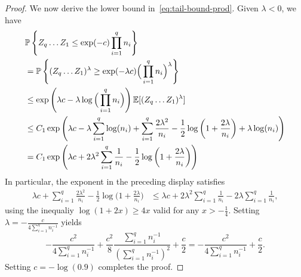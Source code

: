 \begin{proof}
    We now derive the lower bound in~\cref{eq:tail-bound-prod}.
    Given $\lambda < 0$, we have
	\begin{align*}
		 &\mathbb{P}\left\{ {Z_{q} \dots Z_1 \leq \exp(-c) \prod_{i=1}^q n_i} \right\} \\
		 & =\mathbb{P}\left\{ {(Z_{q} \dots Z_1)^{\lambda} \geq \exp(-\lambda c) \Big(\prod_{i=1}^q n_i\Big)^{\lambda}} \right\} \\
		 & \leq
		\exp\left(\lambda c - \lambda \log\Big(\prod_{i=1}^q n_i\Big)\right) \mathbb{E}[(Z_q \dots Z_1)^{\lambda}]
		\\
		 & \leq
		C_1 \exp\left(\lambda c - \lambda \sum_{i=1}^q \log(n_i)
		+ \sum_{i=1}^q \frac{2\lambda^2}{n_i} - \frac{1}{2} \log\left(1 + \frac{2\lambda}{n_i}\right)
		+ \lambda \log(n_i)
		\right)                                                                                            \\
		 & =
		C_1 \exp\left(
		\lambda c + 2 \lambda^2 \sum_{i=1}^q \frac{1}{n_i} - \frac{1}{2} \log\left(1 + \frac{2 \lambda}{n_i}\right)
		\right)
	\end{align*}
    In particular, the exponent in the preceding display satisfies
    \begin{align*}
        \lambda c + \sum_{i = 1}^q \frac{2 \lambda^2}{n_i} - \frac{1}{2} \log\Big(1 + \frac{2 \lambda}{n_i}\Big)
        & \leq
        \lambda c + 2 \lambda^2 \sum_{i = 1}^q 
        \frac{1}{n_i} - 2 \lambda \sum_{i=1}^q \frac{1}{n_i},
    \end{align*}
    using the inequaliy $\log(1 + 2x) \geq 4x$ valid for any $x > -\frac{1}{4}$. Setting $\lambda = -\frac{c}{4 \sum_{i=1}^q n_i^{-1}}$ yields
    \[
        -\frac{c^2}{4 \sum_{i=1}^q n_i^{-1}} +
        \frac{c^2}{8} \frac{\sum_{i=1}^q n_i^{-1}}{(\sum_{i=1}^q n_i^{-1})^2}
        +\frac{c}{2}
        =
        -\frac{c^2}{4 \sum_{i = 1}^q n_i^{-1}} + \frac{c}{2}.
    \]
    Setting $c = -\log(0.9)$ completes the proof.
\end{proof}

